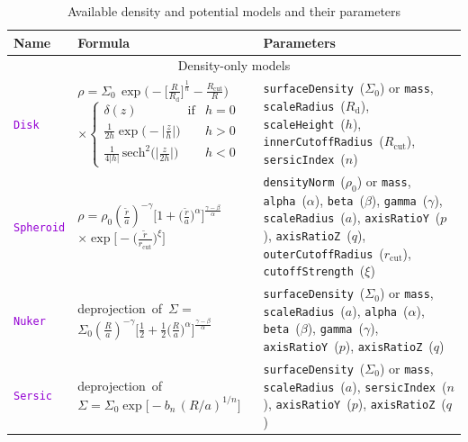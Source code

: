 \documentclass[12pt]{article}
\newcommand{\ttt}[1]{\textcolor{darkviolet}{\texttt{#1}}}
\newcommand{\ppp}[1]{\textcolor{darkolive} {\texttt{#1}}}
\begin{document}
\begin{table}
\caption{Available density and potential models and their parameters}  \label{tab:PotentialParams}
\begin{tabular}{l m{5cm} >{\raggedright\arraybackslash}m{7cm}}
Name & Formula & Parameters \\
\hline
\multicolumn{3}{c}{Density-only models} \\

\ttt{Disk} & $\rho = \Sigma_0\,\exp\big(-\big[\frac{R}{R_\mathrm{d}}\big]^{\frac1n} - \frac{R_\mathrm{cut}}{R}\big)$
$\times\left\{ \begin{array}{ll} \delta(z)\qquad\qquad\mbox{if} & h=0 \\[1mm]
\frac{1}{2h} \exp\big(-\big|\frac{z}{h}\big|\big) & h>0 \\[1mm]
\frac{1}{4|h|}\, \mathrm{sech}^2\big(\big|\frac{z}{2h}\big|\big) & h<0 \end{array} \right. $ &
\ppp{surfaceDensity}~($\Sigma_0$) or \ppp{mass}, \ppp{scaleRadius}~($R_\mathrm{d}$), \ppp{scaleHeight}~($h$), \ppp{innerCutoffRadius}~($R_\mathrm{cut}$), \ppp{sersicIndex}~($n$)\\

\ttt{Spheroid} & $\rho = \rho_0  \left(\frac{\tilde r}{a}\right)^{-\gamma} \Big[ 1 + \big(\frac{\tilde r}{a}\big)^\alpha \Big]^{\frac{\gamma-\beta}{\alpha}}$ $\times \exp\Big[ -\big(\frac{\tilde r}{r_\mathrm{cut}}\big)^\xi\Big] $ &
\ppp{densityNorm}~($\rho_0$) or \ppp{mass}, \ppp{alpha}~($\alpha$), \ppp{beta}~($\beta$), \ppp{gamma}~($\gamma$), \ppp{scaleRadius}~($a$), \ppp{axisRatioY}~($p$), \ppp{axisRatioZ}~($q$), \ppp{outerCutoffRadius}~($r_\mathrm{cut}$), \ppp{cutoffStrength}~($\xi$) \\[2mm]

\ttt{Nuker} & \mbox{deprojection of $\Sigma={}$} \mbox{$\Sigma_0 \left(\frac{R}{a}\right)^{-\gamma} \Big[ \frac12 + \frac12\big(\frac{R}{a}\big)^\alpha \Big]^{\frac{\gamma-\beta}{\alpha}}$} & \ppp{surfaceDensity}~($\Sigma_0$) or \ppp{mass}, \ppp{scaleRadius}~($a$), \ppp{alpha}~($\alpha$), \ppp{beta}~($\beta$), \ppp{gamma}~($\gamma$), \ppp{axisRatioY}~($p$), \ppp{axisRatioZ}~($q$) \\[2mm]

\ttt{Sersic} & \mbox{deprojection of} \mbox{$\Sigma = \Sigma_0 \exp\big[-b_n\,(R/a)^{1/n}\big]$} & \ppp{surfaceDensity}~($\Sigma_0$) or \ppp{mass}, \ppp{scaleRadius}~($a$), \ppp{sersicIndex}~($n$), \ppp{axisRatioY}~($p$), \ppp{axisRatioZ}~($q$) \\[2mm]


\end{tabular}
\end{table}
\end{document}
